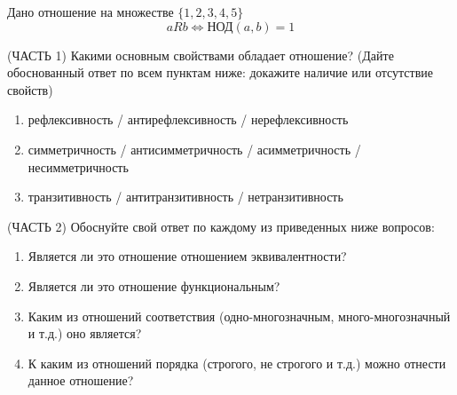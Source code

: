 \question
Дано отношение на множестве $\{1, 2, 3, 4, 5\}$ 
\begin{equation*}
	aRb \iff  \text{НОД}(a,b) =1
\end{equation*}

(ЧАСТЬ 1) Какими основным свойствами обладает отношение? (Дайте обоснованный ответ по всем пунктам ниже: докажите наличие или отсутствие свойств)  
\begin{enumerate}
	\renewcommand{\labelenumi}{\alph{enumi})}
	\item рефлексивность / антирефлексивность / нерефлексивность
	\item симметричность / антисимметричность / асимметричность / несимметричность
	\item транзитивность / антитранзитивность / нетранзитивность
\end{enumerate}

(ЧАСТЬ 2) Обоснуйте свой ответ по каждому из приведенных ниже вопросов:
\begin{enumerate}
	\renewcommand{\labelenumi}{\alph{enumi})}
    \item Является ли это отношение отношением эквивалентности?
    \item Является ли это отношение функциональным?
    \item Каким из отношений соответствия (одно-многозначным, много-многозначный и т.д.) оно является?
    \item К каким из отношений порядка (строгого, не строгого и т.д.) можно отнести данное отношение?
\end{enumerate}